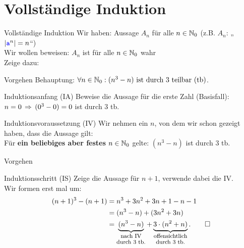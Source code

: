\section{Vollständige Induktion}

\morescalingdelimiters

\begin{frame}{Vollständige Induktion}
	Wir haben: Aussage $A_n$ für alle $n \in \mathbb{N}_0$ (z.B. $A_n$: „$\left\lvert \hbox{\textcolor{blue}{\texttt{a}}}^n \right\rvert = n$“) \\
	Wir wollen beweisen: $A_n$ ist für alle $n \in \mathbb{N}_0$ wahr \\[0.5em]
	\pause
	Zeige dazu: 
\end{frame}

\begin{frame}{Vorgehen}
	Behauptung: $\forall n \in \mathbb{N}_0: (n^3 - n) \text{ ist durch 3 teilbar (tb)}$.
	\pause
	\begin{block}{Induktionsanfang (IA)}
		Beweise die Aussage für die erste Zahl (Basisfall):\\
		$n = 0 \impl (0^3 - 0) = 0$ ist durch 3 tb. \; \textbf{\checked}
	\end{block}
	\pause
	\begin{block}{Induktionsvoraussetzung (IV)}
		Wir nehmen ein $n$, von dem wir schon gezeigt haben, dass die Aussage gilt:\\
		Für \textbf{ein beliebiges aber festes} $n \in \mathbb{N}_0$ gelte: $(n^3 - n)$ ist durch 3 tb. 
	\end{block}
\end{frame}

\begin{frame}{Vorgehen}
	\begin{block}{Induktionsschritt (IS)}
		Zeige die Aussage für $n+1$, verwende dabei die IV.\\
		\pause
		\medskip
		Wir formen erst mal um:
		\begin{align*}
			(n+1)^3 - (n+1) &= n^3 + 3n^2 + 3n + 1 - n - 1 \\
			&= (n^3 - n) + (3n^2 + 3n) \\
			&= \underbrace{(n^3-n)}_{\shortstack{\footnotesize nach IV \\ \footnotesize durch 3 tb.}} + \underbrace{3 \* (n^2 + n)}_{\shortstack{\footnotesize offensichtlich \\ \footnotesize durch 3 tb.}}. \qed
		\end{align*}
	\end{block}

\end{frame}

